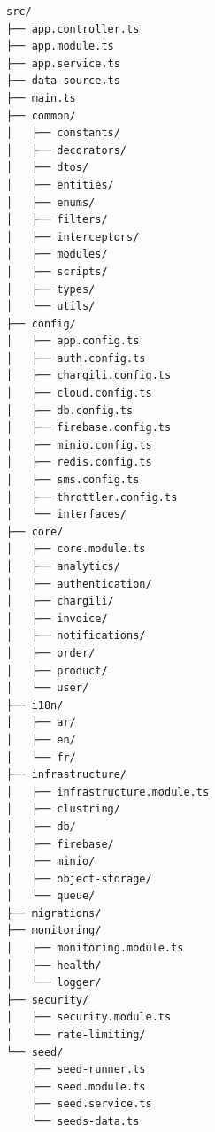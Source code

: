\begin{verbatim}
src/
├── app.controller.ts
├── app.module.ts
├── app.service.ts
├── data-source.ts
├── main.ts
├── common/
│   ├── constants/
│   ├── decorators/
│   ├── dtos/
│   ├── entities/
│   ├── enums/
│   ├── filters/
│   ├── interceptors/
│   ├── modules/
│   ├── scripts/
│   ├── types/
│   └── utils/
├── config/
│   ├── app.config.ts
│   ├── auth.config.ts
│   ├── chargili.config.ts
│   ├── cloud.config.ts
│   ├── db.config.ts
│   ├── firebase.config.ts
│   ├── minio.config.ts
│   ├── redis.config.ts
│   ├── sms.config.ts
│   ├── throttler.config.ts
│   └── interfaces/
├── core/
│   ├── core.module.ts
│   ├── analytics/
│   ├── authentication/
│   ├── chargili/
│   ├── invoice/
│   ├── notifications/
│   ├── order/
│   ├── product/
│   └── user/
├── i18n/
│   ├── ar/
│   ├── en/
│   └── fr/
├── infrastructure/
│   ├── infrastructure.module.ts
│   ├── clustring/
│   ├── db/
│   ├── firebase/
│   ├── minio/
│   ├── object-storage/
│   └── queue/
├── migrations/
├── monitoring/
│   ├── monitoring.module.ts
│   ├── health/
│   └── logger/
├── security/
│   ├── security.module.ts
│   └── rate-limiting/
└── seed/
    ├── seed-runner.ts
    ├── seed.module.ts
    ├── seed.service.ts
    └── seeds-data.ts
\end{verbatim}